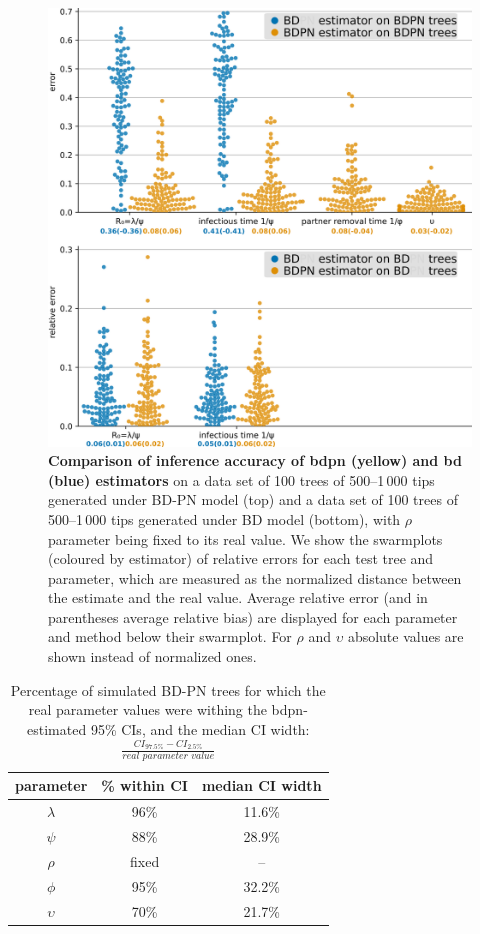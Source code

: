 \documentclass[10pt,letterpaper]{article}
\begin{document}
\begin{figure}[h!]
\centering 
\includegraphics[width=1\textwidth]{Fig_errors_p.png}
\caption{\textbf{Comparison of inference accuracy of bdpn (yellow) and bd (blue) estimators} on a data set of 100 trees of 500--1\,000 tips generated under BD-PN model (top) and a data set of 100 trees of 500--1\,000 tips generated under BD model (bottom), with $\rho$ parameter being fixed to its real value.
We show the swarmplots (coloured by estimator) of relative errors for each test tree and parameter, which are measured as the normalized distance between the estimate and the real value. Average relative error (and in parentheses average relative bias) are displayed for each parameter and method below their swarmplot. For $\rho$ and $\upsilon$ absolute values are shown instead of normalized ones. } 
\label{fig:sim} 
\end{figure}
 
 \begin{table}[!h]\centering
\small
\caption{Percentage of simulated BD-PN trees for which the real parameter values were withing the bdpn-estimated 95\% CIs, and the median CI width: $\frac{CI_{97.5\%} - CI_{2.5\%}}{\textit{real parameter value}}$  \smallskip}
\begin{tabular}{c|cc}
\textbf{parameter} & \% within CI & median CI width  \\
\toprule 
 $\lambda$ & 96\% & 11.6\%\\
 $\psi$ & 88\% & 28.9\% \\
 $\rho$ & fixed & -- \\
 $\phi$ & 95\% & 32.2\% \\
 $\upsilon$ & 70\% & 21.7\% \\
\bottomrule
\end{tabular}
\label{tbl:ci}
\end{table}
\end{document}
